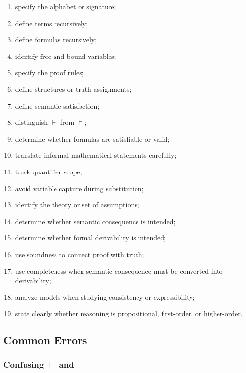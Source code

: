 \begin{enumerate}
    \item specify the alphabet or signature;
    \item define terms recursively;
    \item define formulas recursively;
    \item identify free and bound variables;
    \item specify the proof rules;
    \item define structures or truth assignments;
    \item define semantic satisfaction;
    \item distinguish \(\vdash\) from \(\models\);
    \item determine whether formulas are satisfiable or valid;
    \item translate informal mathematical statements carefully;
    \item track quantifier scope;
    \item avoid variable capture during substitution;
    \item identify the theory or set of assumptions;
    \item determine whether semantic consequence is intended;
    \item determine whether formal derivability is intended;
    \item use soundness to connect proof with truth;
    \item use completeness when semantic consequence must be converted into
          derivability;
    \item analyze models when studying consistency or expressibility;
    \item state clearly whether reasoning is propositional, first-order, or
          higher-order.
\end{enumerate}

\subsection{Common Errors}
\label{subsec:formal-logic-common-errors}

\subsubsection{Confusing \(\vdash\) and \(\models\)}

